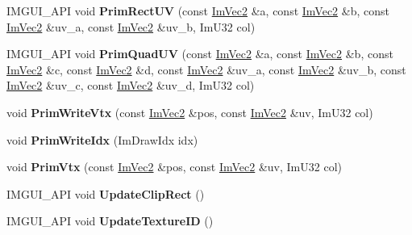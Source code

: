 \begin{DoxyCompactItemize}
\mbox{\label{structImDrawList_a77d48ed5b33ccdd908824c0a3bebfff8}} 
I\+M\+G\+U\+I\+\_\+\+A\+PI void {\bfseries Prim\+Rect\+UV} (const \hyperlink{structImVec2}{Im\+Vec2} \&a, const \hyperlink{structImVec2}{Im\+Vec2} \&b, const \hyperlink{structImVec2}{Im\+Vec2} \&uv\+\_\+a, const \hyperlink{structImVec2}{Im\+Vec2} \&uv\+\_\+b, Im\+U32 col)
\item 
\mbox{\label{structImDrawList_a9df27414aaca5f34ac3664a8b82582b5}} 
I\+M\+G\+U\+I\+\_\+\+A\+PI void {\bfseries Prim\+Quad\+UV} (const \hyperlink{structImVec2}{Im\+Vec2} \&a, const \hyperlink{structImVec2}{Im\+Vec2} \&b, const \hyperlink{structImVec2}{Im\+Vec2} \&c, const \hyperlink{structImVec2}{Im\+Vec2} \&d, const \hyperlink{structImVec2}{Im\+Vec2} \&uv\+\_\+a, const \hyperlink{structImVec2}{Im\+Vec2} \&uv\+\_\+b, const \hyperlink{structImVec2}{Im\+Vec2} \&uv\+\_\+c, const \hyperlink{structImVec2}{Im\+Vec2} \&uv\+\_\+d, Im\+U32 col)
\item 
\mbox{\label{structImDrawList_af86de4faf6c8e978fb712ea14c5d0c5f}} 
void {\bfseries Prim\+Write\+Vtx} (const \hyperlink{structImVec2}{Im\+Vec2} \&pos, const \hyperlink{structImVec2}{Im\+Vec2} \&uv, Im\+U32 col)
\item 
\mbox{\label{structImDrawList_a42b72f87a0084c02f11dcd1560c8bbc7}} 
void {\bfseries Prim\+Write\+Idx} (Im\+Draw\+Idx idx)
\item 
\mbox{\label{structImDrawList_a405377158f0028ad8b4fb6509eef4532}} 
void {\bfseries Prim\+Vtx} (const \hyperlink{structImVec2}{Im\+Vec2} \&pos, const \hyperlink{structImVec2}{Im\+Vec2} \&uv, Im\+U32 col)
\item 
\mbox{\label{structImDrawList_a5978db1fc49be781978699e85c6a3251}} 
I\+M\+G\+U\+I\+\_\+\+A\+PI void {\bfseries Update\+Clip\+Rect} ()
\item 
\mbox{\label{structImDrawList_a58998853ed37538ae5a638da032b0005}} 
I\+M\+G\+U\+I\+\_\+\+A\+PI void {\bfseries Update\+Texture\+ID} ()
\end{DoxyCompactItemize}
